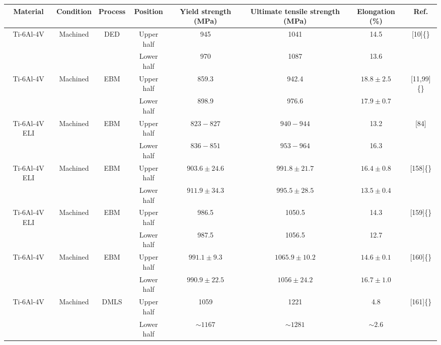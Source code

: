 \documentclass[10pt]{article}
\begin{document}
\begin{center}
\begin{tabular}{|c|c|c|c|c|c|c|c|}
\hline
Material & Condition & Process & Position & Yield strength (MPa) & Ultimate tensile strength (MPa) & Elongation (\%) & Ref. \\
\hline
\multirow[t]{2}{*}{Ti-6Al-4V} & \multirow[t]{2}{*}{Machined} & \multirow[t]{2}{*}{DED} & Upper half & 945 & 1041 & 14.5 & \multirow[t]{2}{*}{[10]\{\}} \\
\hline
 &  &  & Lower half & 970 & 1087 & 13.6 &  \\
\hline
\multirow[t]{2}{*}{Ti-6Al-4V} & \multirow[t]{2}{*}{Machined} & \multirow[t]{2}{*}{EBM} & Upper half & 859.3 & 942.4 & $18.8 \pm 2.5$ & \multirow[t]{2}{*}{[11,99]\{\}} \\
\hline
 &  &  & Lower half & 898.9 & 976.6 & $17.9 \pm 0.7$ &  \\
\hline
\multirow{2}{*}{Ti-6Al-4V ELI} & \multirow{2}{*}{Machined} & \multirow{2}{*}{EBM} & Upper half & $823-827$ & $940-944$ & 13.2 & \multirow[t]{2}{*}{[84]} \\
\hline
 &  &  & Lower half & $836-851$ & $953-964$ & 16.3 &  \\
\hline
\multirow[t]{2}{*}{Ti-6Al-4V ELI} & \multirow[t]{2}{*}{Machined} & \multirow[t]{2}{*}{EBM} & Upper half & $903.6 \pm 24.6$ & $991.8 \pm 21.7$ & $16.4 \pm 0.8$ & \multirow[t]{2}{*}{[158]\{\}} \\
\hline
 &  &  & Lower half & $911.9 \pm 34.3$ & $995.5 \pm 28.5$ & $13.5 \pm 0.4$ &  \\
\hline
\multirow[t]{2}{*}{Ti-6Al-4V ELI} & \multirow[t]{2}{*}{Machined} & \multirow[t]{2}{*}{EBM} & Upper half & 986.5 & 1050.5 & 14.3 & \multirow[t]{2}{*}{[159]\{\}} \\
\hline
 &  &  & Lower half & 987.5 & 1056.5 & 12.7 &  \\
\hline
\multirow[t]{2}{*}{Ti-6Al-4V} & \multirow[t]{2}{*}{Machined} & \multirow[t]{2}{*}{EBM} & Upper half & $991.1 \pm 9.3$ & $1065.9 \pm 10.2$ & $14.6 \pm 0.1$ & \multirow[t]{2}{*}{[160]\{\}} \\
\hline
 &  &  & Lower half & $990.9 \pm 22.5$ & $1056 \pm 24.2$ & $16.7 \pm 1.0$ &  \\
\hline
\multirow[t]{2}{*}{Ti-6Al-4V} & \multirow[t]{2}{*}{Machined} & \multirow[t]{2}{*}{DMLS} & Upper half & 1059 & 1221 & 4.8 & \multirow[t]{2}{*}{[161]\{\}} \\
\hline
 &  &  & Lower half & $\sim 1167$ & $\sim 1281$ & $\sim 2.6$ &  \\
\hline
\end{tabular}
\end{center}
\end{document}
